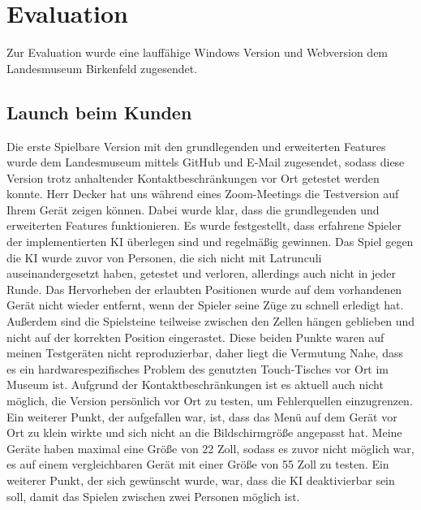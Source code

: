
\chapter{Evaluation}
\label{ch:Evaluierung}
Zur Evaluation wurde eine lauffähige Windows Version und Webversion dem Landesmuseum Birkenfeld zugesendet.

\section{Launch beim Kunden}
\label{ch:Evaluierung:sec:Abschnitt1}
Die erste Spielbare Version mit den grundlegenden und erweiterten Features wurde dem Landesmuseum mittels GitHub und E-Mail zugesendet, sodass diese Version trotz anhaltender Kontaktbeschränkungen vor Ort getestet werden konnte. Herr Decker hat uns während eines Zoom-Meetings die Testversion auf Ihrem Gerät zeigen können. Dabei wurde klar, dass die grundlegenden und erweiterten Features funktionieren. Es wurde festgestellt, dass erfahrene Spieler der implementierten KI überlegen sind und regelmäßig gewinnen. Das Spiel gegen die KI wurde zuvor von Personen, die sich nicht mit Latrunculi auseinandergesetzt haben,  getestet und verloren, allerdings auch nicht in jeder Runde. Das Hervorheben der erlaubten Positionen wurde auf dem vorhandenen Gerät nicht wieder entfernt, wenn der Spieler seine Züge zu schnell erledigt hat. Außerdem sind die Spielsteine teilweise zwischen den Zellen hängen geblieben und nicht auf der korrekten Position eingerastet. Diese beiden Punkte waren auf meinen Testgeräten nicht reproduzierbar, daher liegt die Vermutung Nahe, dass es ein hardwarespezifisches Problem des genutzten Touch-Tisches vor Ort im Museum ist. Aufgrund der Kontaktbeschränkungen ist es aktuell auch nicht möglich, die Version persönlich vor Ort zu testen, um Fehlerquellen einzugrenzen. Ein weiterer Punkt, der aufgefallen war, ist, dass das Menü auf dem Gerät vor Ort zu klein wirkte und sich nicht an die Bildschirmgröße angepasst hat. Meine Geräte haben maximal eine Größe von 22 Zoll, sodass es zuvor nicht möglich war, es auf einem vergleichbaren Gerät mit einer Größe von 55 Zoll zu testen.
Ein weiterer Punkt, der sich gewünscht wurde, war, dass die KI deaktivierbar sein soll, damit das Spielen zwischen zwei Personen möglich ist.

